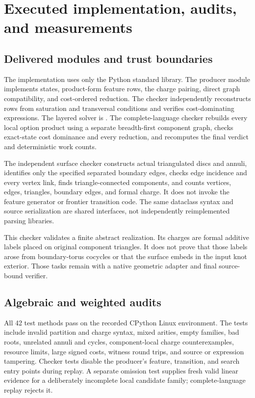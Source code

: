 \documentclass[11pt,letterpaper]{article}
\theoremstyle{definition}
\begin{document}
\section{Executed implementation, audits, and measurements}
\subsection{Delivered modules and trust boundaries}
The implementation uses only the Python standard library. The producer module  implements states, product-form feature rows, the charge pairing, direct graph compatibility, and cost-ordered reduction. The checker  independently reconstructs rows from saturation and transversal conditions and verifies cost-dominating expressions. The layered solver is . The complete-language checker  rebuilds every local option product using a separate breadth-first component graph, checks exact-state cost dominance and every reduction, and recomputes the final verdict and deterministic work counts.

The independent surface checker  constructs actual triangulated discs and annuli, identifies only the specified separated boundary edges, checks edge incidence and every vertex link, finds triangle-connected components, and counts vertices, edges, triangles, boundary edges, and formal charge. It does not invoke the feature generator or frontier transition code. The same dataclass syntax and source serialization are shared interfaces, not independently reimplemented parsing libraries.

This checker validates a finite abstract realization. Its charges are formal additive labels placed on original component triangles. It does not prove that those labels arose from boundary-torus cocycles or that the surface embeds in the input knot exterior. Those tasks remain with a native geometric adapter and final source-bound verifier.

\subsection{Algebraic and weighted audits}
All 42 test methods pass on the recorded CPython \RuntimePython{} Linux environment. The tests include invalid partition and charge syntax, mixed arities, empty families, bad roots, unrelated annuli and cycles, component-local charge counterexamples, resource limits, large signed costs, witness round trips, and source or expression tampering. Checker tests disable the producer's feature, transition, and search entry points during replay. A separate omission test supplies fresh valid linear evidence for a deliberately incomplete local candidate family; complete-language replay rejects it.
\end{document}
